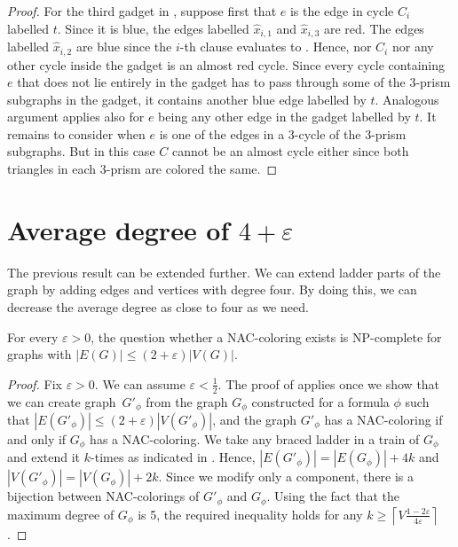 \begin{proof}
	For the third gadget in ,
	suppose first that $e$ is the edge in cycle $C_i$ labelled $t$.
	Since it is blue, the edges labelled $\hat{x}_{i,1}$ and $\hat{x}_{i,3}$ are red.
	The edges labelled $\hat{x}_{i,2}$ are blue since the $i$-th  clause evaluates to \true{}.
	Hence, nor $C_i$ nor any other cycle inside the gadget is an almost red cycle.
	Since every cycle containing $e$ that does not lie entirely in the gadget
	has to pass through some of the 3-prism subgraphs in the gadget, it contains another blue edge labelled by $t$.
	Analogous argument applies also for $e$ being any other edge in the gadget labelled by $t$.
	It remains to consider when $e$ is one of the edges in a 3-cycle of the 3-prism subgraphs.
	But in this case $C$ cannot be an almost cycle either since both triangles in each 3-prism are colored the same.
\end{proof}


\section{Average degree of \( 4 + \varepsilon \)}

The previous result can be extended further.
We can extend ladder parts of the graph by adding
edges and vertices with degree four.
By doing this, we can decrease the average degree as close to four as we need.

\begin{theorem}%
	\label{theorem:nac-eps}
	For every $\varepsilon>0$,
	the question whether a NAC-coloring exists is NP-complete for graphs with $|E(G)| \leq (2 + \varepsilon) |V(G)|$.
\end{theorem}
\begin{proof}
	Fix $\varepsilon>0$. We can assume $\varepsilon<\frac{1}{2}$.
	The proof of  applies once we show that
	we can create graph~$G'_\phi$ from the graph $G_\phi$ constructed for a formula $\phi$
	such that $|E(G'_\phi)| \leq (2 + \varepsilon) |V(G'_\phi)|$, and
	the graph $G'_\phi$ has a NAC-coloring if and only if $G_\phi$ has a NAC-coloring.
	We take any braced ladder in a train of $G_\phi$
	and extend it $k$-times as indicated in .
	Hence, $|E(G'_\phi)| = |E(G_\phi)|+4k$ and $|V(G'_\phi)| = |V(G_\phi)|+2k$.
	Since we modify only a \trcon{} component,
	there is a bijection between NAC-colorings of $G'_\phi$ and $G_\phi$.
	Using the fact that the maximum degree of $G_\phi$ is 5,
	the required inequality holds for any  $k\geq\left\lceil V\frac{1-2\varepsilon}{4\varepsilon}\right\rceil$.
\end{proof}

